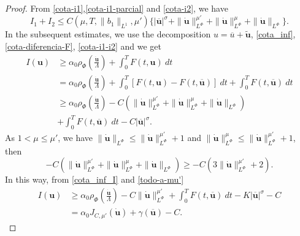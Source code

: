 \documentclass[twoside]{article}
\theoremstyle{remark}
\newcommand{\orlnor}{\|_{L^{\Phi}}}
\renewcommand{\b}[1]{\boldsymbol{#1}}
\renewcommand{\leq}{\leqslant}
\begin{document}
\begin{proof}
From \eqref{cota-i1},\eqref{cota-i1-parcial} and \eqref{cota-i2}, we have
\begin{equation}\label{cota-i1-i2}
I_1+I_2
\leq C(\mu,T, \|b_1\|_{L^1},\mu' )\bigg\{ |\b{\overline{u}}|^{\sigma}
+ \|\b{\dot u}\orlnor^{\mu'}
+ \|\b{\dot u}\orlnor^{\mu}
+\|\b{\dot u}\orlnor\bigg\}.
\end{equation}
In the subsequent estimates, we use the decomposition $u=\overline{u}+\b{\tilde{u}}$, \eqref{cota_inf}, \eqref{cota-diferencia-F},
\eqref{cota-i1-i2} and we get
\begin{equation}\label{cota_inf_I}
\begin{split}
I(\b{u})&\geq\alpha_0\rho_{\Phi}\left( \frac{\b{\dot{u}}}{\Lambda}\right)+\int_0^TF(t,\b{u})\ dt
\\ 
&=\alpha_0\rho_{\Phi}\left( \frac{\b{\dot{u}}}{\Lambda}\right)+ \int_0^T \left[F(t,\b{u})-F(t,\b{\overline{u}})\right]\ dt 
+  \int_0^TF(t,\b{\overline{u}})\ dt
\\
&\geq \alpha_0\rho_{\Phi}\left( \frac{\b{\dot{u}}}{\Lambda}\right)
-C( \|\b{\dot u}\orlnor^{\mu'}
+ \|\b{\dot u}\orlnor^{\mu}
+ \|\b{\dot u}\orlnor)
\\
&+\int_0^TF(t,\b{\overline{u}})\ dt-
C |\b{\overline{u}}|^{\sigma}.
\end{split}
\end{equation}
As $1<\mu\leq \mu'$, we have  
$\|\b{\dot u}\orlnor \le\|\b{\dot u}\orlnor^{\mu'}+1$ and
$\|\b{\dot u}\orlnor^{\mu}\le\|\b{\dot u}\orlnor^{\mu'}+1$, then
\begin{equation}\label{todo-a-mu'}
-C( \|\b{\dot u}\orlnor^{\mu'}
+ \|\b{\dot u}\orlnor^{\mu}
+ \|\b{\dot u}\orlnor)
\geq
-C(3\|\b{\dot u}\orlnor^{\mu'}+2).
\end{equation}
In this way, from \eqref{cota_inf_I} and \eqref{todo-a-mu'}
\[
\begin{split}
I(\b{u})
&\geq\alpha_0\rho_{\Phi}\left( \frac{\b{\dot{u}}}{\Lambda}\right)
-C\|\b{\dot u}\orlnor^{\mu'}
+\int_0^TF(t,\b{\overline{u}})\ dt-K|\b{\overline{u}}|^{\sigma}
-C
\\
&=\alpha_0J_{C,\mu'}(\b{\dot u})
+ \gamma(\b{\overline{u}})-C.
\end{split}
\]





\end{proof}
\end{document}
